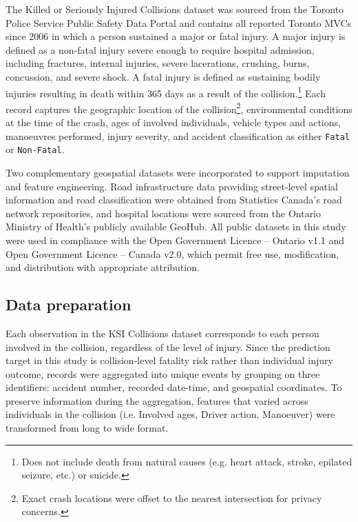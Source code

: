 \documentclass{article}
\begin{document}
The Killed or Seriously Injured Collisions dataset was sourced from the Toronto Police Service Public Safety Data Portal and contains all reported Toronto MVCs since 2006 in which a person sustained a major or fatal injury.\cite{dataset} A major injury is defined as a non-fatal injury severe enough to require hospital admission, including fractures, internal injuries, severe lacerations, crushing, burns, concussion, and severe shock. A fatal injury is defined as sustaining bodily injuries resulting in death within 365 days as a result of the collision.\footnote{Does not include death from natural causes (e.g. heart attack, stroke, epilated seizure, etc.) or suicide.} Each record captures the geographic location of the collision\footnote{Exact crash locations were offset to the nearest intersection for privacy concerns.}, environmental conditions at the time of the crash, ages of involved individuals, vehicle types and actions, manoeuvres performed, injury severity, and accident classification as either \texttt{Fatal} or \texttt{Non-Fatal}.

Two complementary geospatial datasets were incorporated to support imputation and feature engineering. Road infrastructure data providing street-level spatial information and road classification were obtained from Statistics Canada's road network repositories,\cite{roads} and hospital locations were sourced from the Ontario Ministry of Health's publicly available GeoHub.\cite{hospitals} All public datasets in this study were used in compliance with the Open Government Licence – Ontario v1.1 and Open Government Licence – Canada v2.0, which permit free use, modification, and distribution with appropriate attribution.\cite{olg-on, olg-can}

\subsection{Data preparation}

Each observation in the KSI Collisions dataset corresponds to each person involved in the collision, regardless of the level of injury. Since the prediction target in this study is collision-level fatality risk rather than individual injury outcome, records were aggregated into unique events by grouping on three identifiers: accident number, recorded date-time, and geospatial coordinates. To preserve information during the aggregation, features that varied across individuals in the collision (i.e. Involved ages, Driver action, Manoeuver) were transformed from long to wide format.
\end{document}
